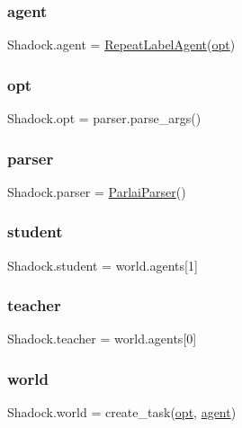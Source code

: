\subsubsection{\texorpdfstring{agent}{agent}}
{\footnotesize\ttfamily Shadock.\+agent = \hyperlink{classShadock_1_1RepeatLabelAgent}{Repeat\+Label\+Agent}(\hyperlink{namespaceShadock_ac5de26058c2175bfdfb877050f0b208e}{opt})}

\mbox{\label{namespaceShadock_ac5de26058c2175bfdfb877050f0b208e}} 
\subsubsection{\texorpdfstring{opt}{opt}}
{\footnotesize\ttfamily Shadock.\+opt = parser.\+parse\+\_\+args()}

\mbox{\label{namespaceShadock_ac8bec66fd11468b8d014b78e0f076168}} 
\subsubsection{\texorpdfstring{parser}{parser}}
{\footnotesize\ttfamily Shadock.\+parser = \hyperlink{classparlai_1_1core_1_1params_1_1ParlaiParser}{Parlai\+Parser}()}

\mbox{\label{namespaceShadock_ab2d7d84abaa3abe19a6117bae9ac9712}} 
\subsubsection{\texorpdfstring{student}{student}}
{\footnotesize\ttfamily Shadock.\+student = world.\+agents\mbox{[}1\mbox{]}}

\mbox{\label{namespaceShadock_a21eede1a81cd93d5171e2c5989796836}} 
\subsubsection{\texorpdfstring{teacher}{teacher}}
{\footnotesize\ttfamily Shadock.\+teacher = world.\+agents\mbox{[}0\mbox{]}}

\mbox{\label{namespaceShadock_ac842a79eeebd6d6a7de512f53c36b056}} 
\subsubsection{\texorpdfstring{world}{world}}
{\footnotesize\ttfamily Shadock.\+world = create\+\_\+task(\hyperlink{namespaceShadock_ac5de26058c2175bfdfb877050f0b208e}{opt}, \hyperlink{namespaceShadock_a3455790d1c4915428cdddf6b9e46a58c}{agent})}

